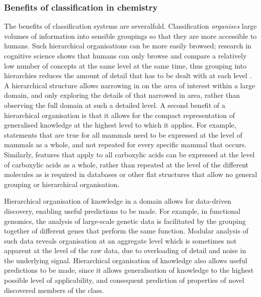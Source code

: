 \documentclass[10pt]{bmc_article}
\newenvironment{bmcformat}{\baselineskip20pt\sloppy\setboolean{publ}{false}}{\baselineskip20pt\sloppy}
\begin{document}
\begin{bmcformat}
\subsubsection*{Benefits of classification in chemistry}
The benefits of classification systems are severalfold. Classification \textit{organises} large volumes of information into sensible groupings so that they are more accessible to humans. Such hierarchical organisations can be more easily browsed; research in cognitive science shows that humans can only browse and compare a relatively low number of concepts at the same level at the same time, thus grouping into hierarchies reduces the amount of detail that has to be dealt with at each level \cite{sternberg2003}. A hierarchical structure allows  narrowing in on the area of interest within a large domain, and only exploring the details of that narrowed in area, rather than observing the full domain at such a detailed level. A second benefit of a hierarchical organisation is that it allows for the compact representation of generalised knowledge at the highest level to which it applies.  For example, statements that are true for all mammals need to be expressed at the level of mammals as a whole, and not repeated for every specific mammal that occurs.  Similarly, features that apply to all carboxylic acids can be expressed at the level of carboxylic acids as a whole, rather than repeated at the level of the different molecules as is required in databases or other flat structures that allow no general grouping or hierarchical organisation. 

Hierarchical organisation of knowledge in a domain allows for data-driven discovery, enabling useful predictions to be made. For example, in functional genomics, the analysis of large-scale genetic data is facilitated by the grouping together of different genes that perform the same function. Modular analysis of such data reveals organisation at an aggregate level which is sometimes not apparent at the level of the raw data, due to overloading of detail and noise in the underlying signal. %
Hierarchical organisation of knowledge also allows useful predictions to be made, since it allows generalisation of knowledge to the highest possible level of applicability, and consequent prediction of properties of novel discovered members of the class.  


\end{bmcformat}
\end{document}
